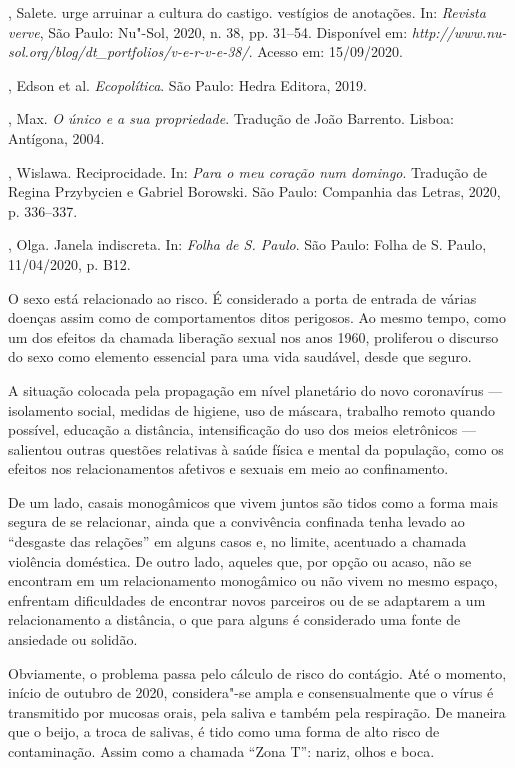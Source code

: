 \begin{bibliohedra}
, Salete. urge arruinar a cultura do castigo. vestígios de
anotações. In: \emph{Revista verve}, São Paulo: Nu"-Sol, 2020, n. 38, pp.
31--54. Disponível em:
\emph{http://www.nu-sol.org/blog/dt\_portfolios/v-e-r-v-e-38/}. Acesso em:
15/09/2020.

, Edson et al. \emph{Ecopolítica}. São Paulo: Hedra Editora,
2019.

, Max. \emph{O único e a sua propriedade}. Tradução de João
Barrento. Lisboa: Antígona, 2004.

, Wislawa. Reciprocidade. In: \emph{Para o meu coração num
domingo}. Tradução de Regina Przybycien e Gabriel Borowski. São Paulo:
Companhia das Letras, 2020, p. 336--337.

, Olga. Janela indiscreta. In: \emph{Folha de S. Paulo}. São
Paulo: Folha de S. Paulo, 11/04/2020, p. B12.
\end{bibliohedra}


O sexo está relacionado ao risco. É considerado a porta de entrada de
várias doenças assim como de comportamentos ditos perigosos. Ao mesmo
tempo, como um dos efeitos da chamada liberação sexual nos anos 1960,
proliferou o discurso do sexo como elemento essencial para uma vida
saudável, desde que seguro.

A situação colocada pela propagação em nível planetário do novo
coronavírus --- isolamento social, medidas de higiene, uso de máscara,
trabalho remoto quando possível, educação a distância, intensificação do
uso dos meios eletrônicos --- salientou outras questões relativas à
saúde física e mental da população, como os efeitos nos relacionamentos
afetivos e sexuais em meio ao confinamento.

De um lado, casais monogâmicos que vivem juntos são tidos como a forma
mais segura de se relacionar, ainda que a convivência confinada tenha
levado ao ``desgaste das relações'' em alguns casos e, no limite,
acentuado a chamada violência doméstica. De outro lado, aqueles que, por
opção ou acaso, não se encontram em um relacionamento monogâmico ou não
vivem no mesmo espaço, enfrentam dificuldades de encontrar novos
parceiros ou de se adaptarem a um relacionamento a distância, o que para
alguns é considerado uma fonte de ansiedade ou solidão.

Obviamente, o problema passa pelo cálculo de risco do contágio. Até o
momento, início de outubro de 2020, considera"-se ampla e consensualmente
que o vírus é transmitido por mucosas orais, pela saliva e também pela
respiração. De maneira que o beijo, a troca de salivas, é tido como uma
forma de alto risco de contaminação. Assim como a chamada ``Zona T'':
nariz, olhos e boca.

